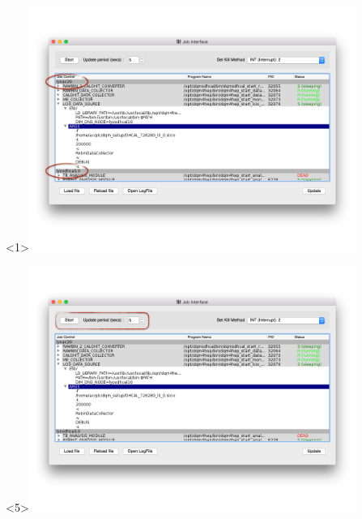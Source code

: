 \documentclass[8pt]{beamer}
\begin{document}
\begin{frame}
\begin{overlayarea}{\textwidth}{\textheight}
\begin{center}
        \begin{onlyenv}<1>\includegraphics[width=0.8\textwidth]{figs/JobInterface/JobInterface_MultiHost.png}\end{onlyenv}
        \begin{onlyenv}<5>\includegraphics[width=0.8\textwidth]{figs/JobInterface/JobInterface_Update.png}\end{onlyenv}
      \end{center}
    \end{overlayarea}
  \end{frame}
  
\end{document}
